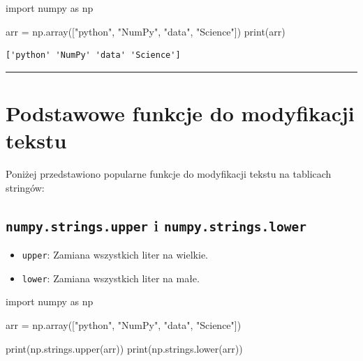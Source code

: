 \documentclass[
  letterpaper,
  DIV=11,
  numbers=noendperiod]{scrreprt}
\newenvironment{Shaded}{\begin{snugshade}}{\end{snugshade}}
\newcommand{\BuiltInTok}[1]{\textcolor[rgb]{0.00,0.23,0.31}{#1}}
\newcommand{\ImportTok}[1]{\textcolor[rgb]{0.00,0.46,0.62}{#1}}
\newcommand{\NormalTok}[1]{\textcolor[rgb]{0.00,0.23,0.31}{#1}}
\newcommand{\OperatorTok}[1]{\textcolor[rgb]{0.37,0.37,0.37}{#1}}
\newcommand{\StringTok}[1]{\textcolor[rgb]{0.13,0.47,0.30}{#1}}
\providecommand{\tightlist}{%
  \setlength{\itemsep}{0pt}\setlength{\parskip}{0pt}}\usepackage{longtable,booktabs,array}
\begin{document}
\begin{Shaded}
\begin{Highlighting}[]
\ImportTok{import}\NormalTok{ numpy }\ImportTok{as}\NormalTok{ np}

\NormalTok{arr }\OperatorTok{=}\NormalTok{ np.array([}\StringTok{"python"}\NormalTok{, }\StringTok{"NumPy"}\NormalTok{, }\StringTok{"data"}\NormalTok{, }\StringTok{"Science"}\NormalTok{])}
\BuiltInTok{print}\NormalTok{(arr)}
\end{Highlighting}
\end{Shaded}

\begin{verbatim}
['python' 'NumPy' 'data' 'Science']
\end{verbatim}

\begin{center}\rule{0.5\linewidth}{0.5pt}\end{center}

\section{Podstawowe funkcje do modyfikacji
tekstu}\label{podstawowe-funkcje-do-modyfikacji-tekstu}

Poniżej przedstawiono popularne funkcje do modyfikacji tekstu na
tablicach stringów:

\subsection{\texorpdfstring{\texttt{numpy.strings.upper} i
\texttt{numpy.strings.lower}}{numpy.strings.upper i numpy.strings.lower}}\label{numpy.strings.upper-i-numpy.strings.lower}

\begin{itemize}
\tightlist
\item
  \texttt{upper}: Zamiana wszystkich liter na wielkie.
\item
  \texttt{lower}: Zamiana wszystkich liter na małe.
\end{itemize}

\begin{Shaded}
\begin{Highlighting}[]
\ImportTok{import}\NormalTok{ numpy }\ImportTok{as}\NormalTok{ np}

\NormalTok{arr }\OperatorTok{=}\NormalTok{ np.array([}\StringTok{"python"}\NormalTok{, }\StringTok{"NumPy"}\NormalTok{, }\StringTok{"data"}\NormalTok{, }\StringTok{"Science"}\NormalTok{])}

\BuiltInTok{print}\NormalTok{(np.strings.upper(arr))}
\BuiltInTok{print}\NormalTok{(np.strings.lower(arr))}
\end{Highlighting}
\end{Shaded}
\end{document}

